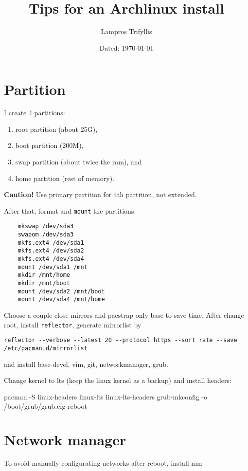 \documentclass[letterpaper]{article}
\title{Tips for an Archlinux install}
\author{Lampros Trifyllis}
\date{Dated: \today}
\begin{document}
\maketitle


\section{Partition}
I create 4 partitions: 
\begin{enumerate}
    \item  root partition (about 25G), 
    \item  boot partition (200M), 
    \item  swap partition (about twice the ram), and 
    \item  home partition (rest of memory).  
\end{enumerate}

\noindent
{\bf Caution!} Use primary partition for 4th partition, not extended. 

\noindent
After that, format and \texttt{mount} the partitions 

\begin{lstlisting}
    mkswap /dev/sda3
    swapom /dev/sda3
    mkfs.ext4 /dev/sda1 
    mkfs.ext4 /dev/sda2 
    mkfs.ext4 /dev/sda4 
    mount /dev/sda1 /mnt
    mkdir /mnt/home
    mkdir /mnt/boot
    mount /dev/sda2 /mnt/boot
    mount /dev/sda4 /mnt/home
\end{lstlisting}
Choose a couple close mirrors and pacstrap only base to save time.
After change root, install \lstinline{reflector}, generate mirrorlist by 
\begin{lstlisting}
reflector --verbose --latest 20 --protocol https --sort rate --save /etc/pacman.d/mirrorlist
\end{lstlisting}

and install base-devel, vim, git, networkmanager, grub.

Change kernel to lts (keep the linux kernel as a backup) 
and install headers: 

pacman -S linux-headers linux-lts linux-lts-headers 
grub-mkconfig -o /boot/grub/grub.cfg
reboot



\section{Network manager}
To avoid manually configurating networks after reboot, install nm:
\end{document}

